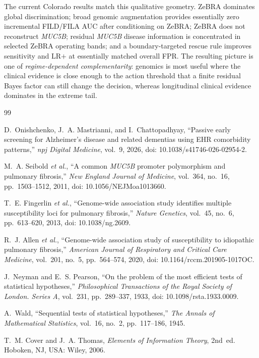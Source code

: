 \documentclass[journal]{IEEEtran}
\begin{document}
The current Colorado results match this qualitative geometry. ZeBRA dominates global discrimination; broad genomic augmentation provides essentially zero incremental FILD/FILA AUC after conditioning on ZeBRA; ZeBRA does not reconstruct \textit{MUC5B}; residual \textit{MUC5B} disease information is concentrated in selected ZeBRA operating bands; and a boundary-targeted rescue rule improves sensitivity and LR$+$ at essentially matched overall FPR. The resulting picture is one of \emph{regime-dependent complementarity}: genomics is most useful where the clinical evidence is close enough to the action threshold that a finite residual Bayes factor can still change the decision, whereas longitudinal clinical evidence dominates in the extreme tail.

\begin{thebibliography}{99}

D.~Onishchenko, J.~A. Mastrianni, and I.~Chattopadhyay,
``Passive early screening for Alzheimer's disease and related dementias using EHR comorbidity patterns,''
\emph{npj Digital Medicine}, vol.~9, 2026, doi: 10.1038/s41746-026-02954-2.

M.~A. Seibold \emph{et al.},
``A common \textit{MUC5B} promoter polymorphism and pulmonary fibrosis,''
\emph{New England Journal of Medicine}, vol.~364, no.~16, pp.~1503--1512, 2011, doi: 10.1056/NEJMoa1013660.

T.~E. Fingerlin \emph{et al.},
``Genome-wide association study identifies multiple susceptibility loci for pulmonary fibrosis,''
\emph{Nature Genetics}, vol.~45, no.~6, pp.~613--620, 2013, doi: 10.1038/ng.2609.

R.~J. Allen \emph{et al.},
``Genome-wide association study of susceptibility to idiopathic pulmonary fibrosis,''
\emph{American Journal of Respiratory and Critical Care Medicine}, vol.~201, no.~5, pp.~564--574, 2020, doi: 10.1164/rccm.201905-1017OC.

J.~Neyman and E.~S. Pearson,
``On the problem of the most efficient tests of statistical hypotheses,''
\emph{Philosophical Transactions of the Royal Society of London. Series A}, vol.~231, pp.~289--337, 1933, doi: 10.1098/rsta.1933.0009.

A.~Wald,
``Sequential tests of statistical hypotheses,''
\emph{The Annals of Mathematical Statistics}, vol.~16, no.~2, pp.~117--186, 1945.

T.~M. Cover and J.~A. Thomas,
\emph{Elements of Information Theory}, 2nd~ed.
Hoboken, NJ, USA: Wiley, 2006.

\end{thebibliography}
\end{document}
